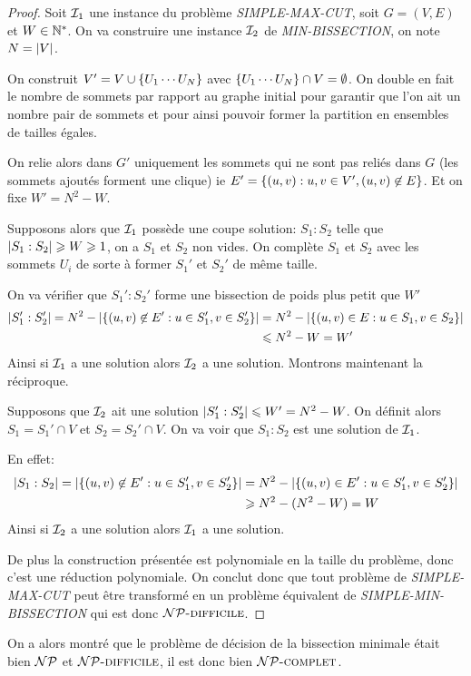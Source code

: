 \documentclass{standalone}
\begin{document}
\begin{proof}
Soit $\mathcal I_1$ une instance du problème \textit{SIMPLE-MAX-CUT}, soit $G=(V,E)$ et $W \in \mathbb{N}^*$. On va construire une instance $\mathcal I_2$ de \textit{MIN-BISSECTION}, on note $N = \left| V\right|$.

On construit $V' = V \cup \left\{ U_1 \cdots U_N\right\}$ avec $\left\{ U_1 \cdots U_N\right\} \cap V = \emptyset$. On double en fait le nombre de sommets par rapport au graphe initial pour garantir que l'on ait un nombre pair de sommets et pour ainsi pouvoir former la partition en ensembles de tailles égales.

On relie alors dans $G'$ uniquement les sommets qui ne sont pas reliés dans $G$ (les sommets ajoutés forment une clique) ie $E' = \left\{ (u,v) : u,v \in V', (u,v) \not \in E\right\}$. Et on fixe $W' = N^2 - W$.

Supposons alors que $\mathcal I_1$ possède une coupe solution: $S_1:S_2$ telle que $\left| S_1:S_2\right| \geqslant W \geqslant 1$, on a $S_1$ et $S_2$ non vides.
On complète $S_1$ et $S_2$ avec les sommets $U_i$ de sorte à former $S_1'$ et $S_2'$ de même taille.

On va vérifier que $S_1':S_2'$ forme une bissection de poids plus petit que $W'$
\begin{align*}
	\left| S_1':S_2'\right| = N^2 - \left| \left\{ (u,v) \not \in E' : u \in S_1', v \in S_2'\right\}\right| &= N^2 - \left| \left\{ (u,v) \in E : u \in S_1, v \in S_2\right\}\right| \\
					& \leqslant N^2 - W = W'
\end{align*}
Ainsi si $\mathcal I_1$ a une solution alors $\mathcal I_2$ a une solution. Montrons maintenant la réciproque.

Supposons que $\mathcal I_2$ ait une solution $\left| S_1':S_2'\right| \leqslant W' = N^2 - W$. On définit alors $S_1 = S_1' \cap V$ et $S_2 = S_2' \cap V$. On va voir que $S_1:S_2$ est une solution de $\mathcal I_1$.

En effet: 
\begin{align*}
	\left| S_1:S_2\right| = \left| \left\{ (u,v) \not \in E' : u \in S_1', v \in S_2'\right\}\right| &= N^2 -  \left| \left\{ (u,v) \in E' : u \in S_1', v \in S_2'\right\}\right| \\
				   &\geqslant N^2 - (N^2 - W) = W
\end{align*}
Ainsi si $\mathcal I_2$ a une solution alors $\mathcal I_1$ a une solution.

De plus la construction présentée est polynomiale en la taille du problème, donc c'est une réduction polynomiale. On conclut donc que tout problème de \textit{SIMPLE-MAX-CUT} peut être transformé en un problème équivalent de \textit{SIMPLE-MIN-BISSECTION} qui est donc $\mathcal{NP}\text{\textsc{-difficile}}$. 
\end{proof}

On a alors montré que le problème de décision de la bissection minimale était bien $\mathcal{NP}$ et $\mathcal{NP}\text{\textsc{-difficile}}$, il est donc bien $\mathcal{NP}\text{\textsc{-complet}}$.
\end{document}
